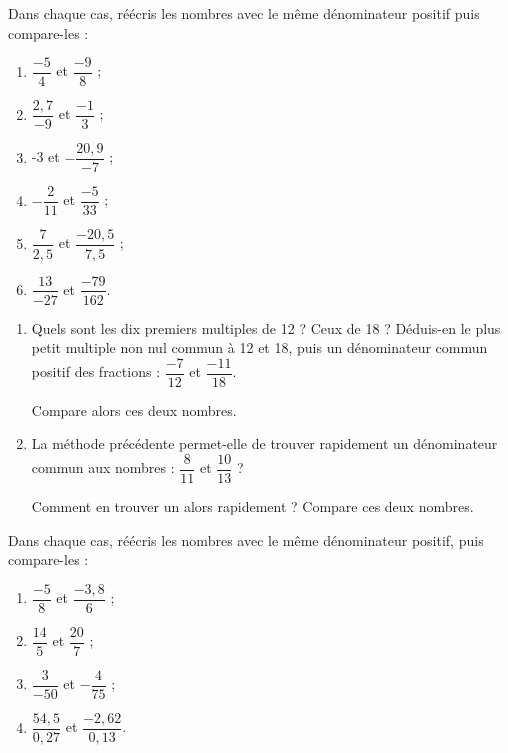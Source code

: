\begin{exercice}
Dans chaque cas, réécris les nombres avec le même dénominateur positif puis compare-les :
\begin{enumerate} 
\item $\dfrac{-5}{4}$ et $\dfrac{-9}{8}$ ;
\item $\dfrac{2,7}{-9}$ et $\dfrac{-1}{3}$ ;
\item -3 et $-\dfrac{20,9}{-7}$ ;
\item $-\dfrac{2}{11}$ et $\dfrac{-5}{33}$ ; 
\item $\dfrac{7}{2,5}$ et $\dfrac{-20,5}{7,5}$ ; 
\item $\dfrac{13}{-27}$ et $\dfrac{-79}{162}$.
\end{enumerate}
\end{exercice}




\begin{exercice}
\begin{enumerate}
\item Quels sont les dix premiers multiples de 12 ? Ceux de 18 ? Déduis-en le plus petit multiple non nul commun à 12 et 18, puis un dénominateur commun positif des fractions : $\dfrac{-7}{12}$ et $\dfrac{-11}{18}$.

Compare alors ces deux nombres.
\item La méthode précédente permet-elle de trouver rapidement un dénominateur commun aux nombres : $\dfrac{8}{11}$ et $\dfrac{10}{13}$ ?

Comment en trouver un alors rapidement ? Compare ces deux nombres.
\end{enumerate}
\end{exercice}





\begin{exercice}Dans chaque cas, réécris les nombres avec le même dénominateur positif, puis compare-les :
\begin{enumerate}
\item $\dfrac{-5}{8}$ et $\dfrac{-3,8}{6}$ ;
\item $\dfrac{14}{5}$ et $\dfrac{20}{7}$ ;
\item $\dfrac{3}{-50}$ et $-\dfrac{4}{75}$ ;
\item $\dfrac{54,5}{0,27}$ et $\dfrac{-2,62}{0,13}$.
\end{enumerate}
\end{exercice}






